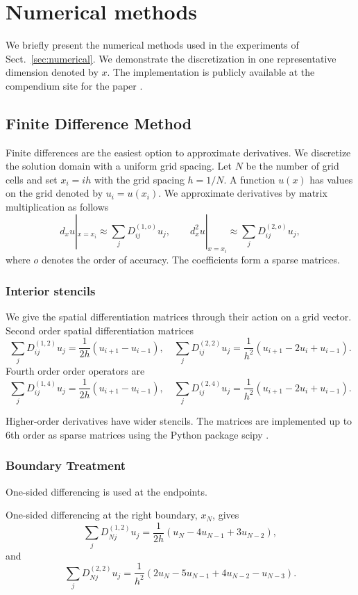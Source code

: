 \documentclass[draft,onefignum,onetabnum]{siamart190516}
\begin{document}
\section{Numerical methods}
We briefly present the numerical methods used in the experiments of Sect.~\ref{sec:numerical}. We demonstrate the discretization in one representative dimension denoted by $x$. The implementation is publicly available at the compendium site for the paper \cite{compendium}.

\subsection{Finite Difference Method}
Finite differences are the easiest option to approximate derivatives. We discretize the solution domain with a uniform grid spacing. Let $N$ be the number of grid cells and set $x_i=i h$ with the grid spacing $h=1/N$. A function $u(x)$ has values on the grid denoted by $u_i=u(x_i)$. We approximate derivatives by matrix multiplication as follows
\[ d_x u|_{x=x_i} \approx \sum_j {D_{ij}^{(1,o)}} u_j, \qquad d_x^2 u|_{x=x_i} \approx \sum_j D_{ij}^{(2,o)} u_j, \]
where $o$ denotes the order of accuracy. The coefficients form a sparse matrices.

\subsubsection{Interior stencils}
We give the spatial differentiation matrices through their action on a grid vector. 
Second order spatial differentiation matrices 
\[ \sum_j {D_{ij}^{(1,2)}} u_j  = \frac{1}{2h} (u_{i+1}- u_{i-1}), \quad \sum_j {D_{ij}^{(2,2)}} u_j = \frac{1}{h^2} (u_{i+1}- 2 u_i + u_{i-1}). \]
Fourth order order operators are 
\[ \sum_j {D_{ij}^{(1,4)}} u_j  = \frac{1}{2h} (u_{i+1}- u_{i-1}), \quad \sum_j {D_{ij}^{(2,4)}} u_j = \frac{1}{h^2} (u_{i+1}- 2 u_i + u_{i-1}). \]

Higher-order derivatives have wider stencils. The matrices are implemented up to 6th order as sparse matrices using the Python package scipy \cite{2020SciPy-NMeth}.


\subsubsection{Boundary Treatment}
One-sided differencing is used at the endpoints. 

One-sided differencing at the right boundary, $x_N$, gives
\[ \sum_j {D_{Nj}^{(1,2)}} u_j = \frac{1}{2h}(u_N - 4 u_{N-1} + 3 u_{N-2}),\]
and
\[ \sum_j {D_{Nj}^{(2,2)}} u_j = \frac{1}{h^2}(2 u_N - 5 u_{N-1} + 4 u_{N-2} - u_{N-3}).\]
\end{document}
